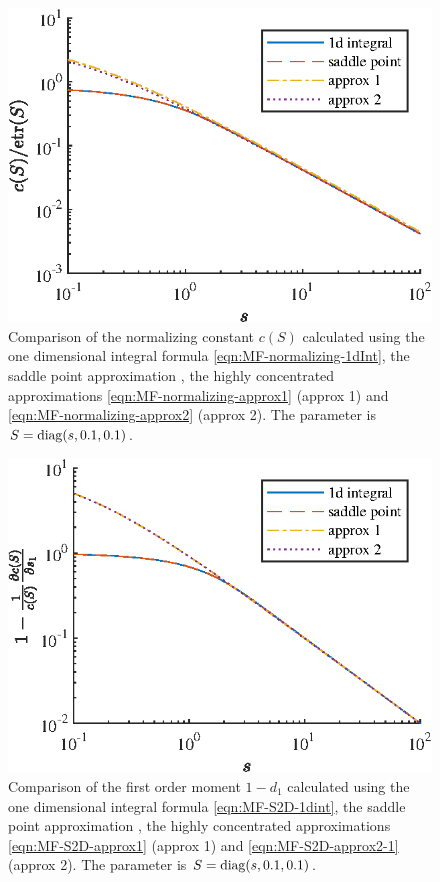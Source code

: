 \begin{figure}
	\centering
	\includegraphics[scale=1.4]{figures/MF-normal-approx2}
	\caption[Comparison of the normalizing constant $c(S)$ calculated using different methods.]{Comparison of the normalizing constant $c(S)$ calculated using the one dimensional integral formula \eqref{eqn:MF-normalizing-1dInt}, the saddle point approximation \cite{kume2005saddlepoint}, the highly concentrated approximations \eqref{eqn:MF-normalizing-approx1} (approx 1) and \eqref{eqn:MF-normalizing-approx2} (approx 2).
	The parameter is $S = \mathrm{diag}(s,0.1,0.1)$.
	\label{fig:MF-nomral-approx2}}
\end{figure}

\begin{figure}
	\centering
	\includegraphics[scale=1.4]{figures/MF-S2D-approx2-1}
	\caption[Comparison of the first order moment $1-d_1$ calculated using different methods.]{Comparison of the first order moment $1-d_1$ calculated using the one dimensional integral formula \eqref{eqn:MF-S2D-1dint}, the saddle point approximation \cite{kume2005saddlepoint,kume2007derivatives}, the highly concentrated approximations \eqref{eqn:MF-S2D-approx1} (approx 1) and \eqref{eqn:MF-S2D-approx2-1} (approx 2).
	The parameter is $S = \mathrm{diag}(s,0.1,0.1)$.
	\label{fig:MF-S2D-approx2-1}}
\end{figure}

